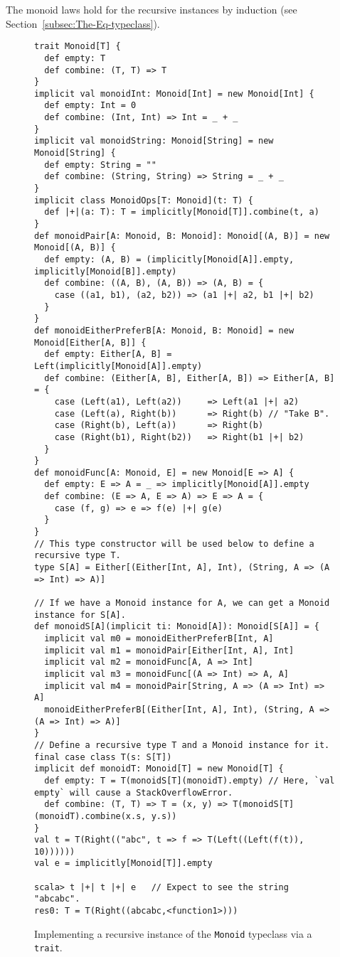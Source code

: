 The monoid laws hold for the recursive instances by induction (see
Section~\ref{subsec:The-Eq-typeclass}).

\begin{figure}
\begin{lstlisting}[frame=single,fillcolor={\color{black}},framesep={0.2mm},framexleftmargin=2mm,framexrightmargin=2mm,framextopmargin=2mm,framexbottommargin=2mm]
trait Monoid[T] {
  def empty: T
  def combine: (T, T) => T
}
implicit val monoidInt: Monoid[Int] = new Monoid[Int] {
  def empty: Int = 0
  def combine: (Int, Int) => Int = _ + _
}
implicit val monoidString: Monoid[String] = new Monoid[String] {
  def empty: String = ""
  def combine: (String, String) => String = _ + _
}
implicit class MonoidOps[T: Monoid](t: T) {
  def |+|(a: T): T = implicitly[Monoid[T]].combine(t, a)
}
def monoidPair[A: Monoid, B: Monoid]: Monoid[(A, B)] = new Monoid[(A, B)] {
  def empty: (A, B) = (implicitly[Monoid[A]].empty, implicitly[Monoid[B]].empty)
  def combine: ((A, B), (A, B)) => (A, B) = {
    case ((a1, b1), (a2, b2)) => (a1 |+| a2, b1 |+| b2)
  }
}
def monoidEitherPreferB[A: Monoid, B: Monoid] = new Monoid[Either[A, B]] {
  def empty: Either[A, B] = Left(implicitly[Monoid[A]].empty)
  def combine: (Either[A, B], Either[A, B]) => Either[A, B] = {
    case (Left(a1), Left(a2))     => Left(a1 |+| a2)
    case (Left(a), Right(b))      => Right(b) // "Take B".
    case (Right(b), Left(a))      => Right(b)
    case (Right(b1), Right(b2))   => Right(b1 |+| b2)
  }
}
def monoidFunc[A: Monoid, E] = new Monoid[E => A] {
  def empty: E => A = _ => implicitly[Monoid[A]].empty
  def combine: (E => A, E => A) => E => A = {
    case (f, g) => e => f(e) |+| g(e)
  }
}
// This type constructor will be used below to define a recursive type T.
type S[A] = Either[(Either[Int, A], Int), (String, A => (A => Int) => A)]

// If we have a Monoid instance for A, we can get a Monoid instance for S[A].
def monoidS[A](implicit ti: Monoid[A]): Monoid[S[A]] = {
  implicit val m0 = monoidEitherPreferB[Int, A]
  implicit val m1 = monoidPair[Either[Int, A], Int]
  implicit val m2 = monoidFunc[A, A => Int]
  implicit val m3 = monoidFunc[(A => Int) => A, A]
  implicit val m4 = monoidPair[String, A => (A => Int) => A]
  monoidEitherPreferB[(Either[Int, A], Int), (String, A => (A => Int) => A)]
}
// Define a recursive type T and a Monoid instance for it.
final case class T(s: S[T])
implicit def monoidT: Monoid[T] = new Monoid[T] {
  def empty: T = T(monoidS[T](monoidT).empty) // Here, `val empty` will cause a StackOverflowError.
  def combine: (T, T) => T = (x, y) => T(monoidS[T](monoidT).combine(x.s, y.s))
}
val t = T(Right(("abc", t => f => T(Left((Left(f(t)), 10))))))
val e = implicitly[Monoid[T]].empty

scala> t |+| t |+| e   // Expect to see the string "abcabc".
res0: T = T(Right((abcabc,<function1>)))
\end{lstlisting}

\caption{Implementing a recursive instance of the \lstinline!Monoid! typeclass
via a \lstinline!trait!. \label{fig:Implementation-of-Monoid-typeclass-with-trait}}
\end{figure}


